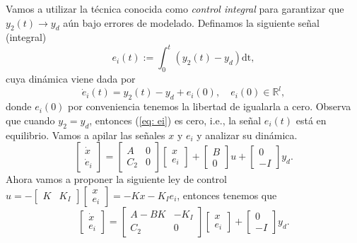 Vamos a utilizar la técnica conocida como \emph{control integral} para garantizar que $y_2(t) \to y_d$ aún bajo errores de modelado. Definamos la siguiente señal (integral)
\begin{equation}
	e_i(t) := \int_0^t (y_2(t) - y_d) \mathrm{dt},
	\label{eq: ei}
\end{equation}
cuya dinámica viene dada por
\begin{equation}
	\dot e_i(t) = y_2(t) - y_d + e_i(0), \quad e_i(0)\in\mathbb{R}^l,
	\label{eq: dei}
\end{equation}
donde $e_i(0)$ por conveniencia tenemos la libertad de igualarla a cero. Observa que cuando $y_2 = y_d$, entonces (\ref{eq: ei}) es cero, i.e., la señal $e_i(t)$ está en equilibrio. Vamos a apilar las señales $x$ y $e_i$ y analizar su dinámica.
\begin{equation}
	\begin{bmatrix}\dot x \\ \dot e_i\end{bmatrix} = \begin{bmatrix}A & 0 \\ C_2 & 0\end{bmatrix}\begin{bmatrix}x \\ e_i\end{bmatrix} + \begin{bmatrix}B \\ 0 \end{bmatrix} u + \begin{bmatrix}0 \\ -I\end{bmatrix} y_d.
	\label{eq: xei}
\end{equation}
Ahora vamos a proponer la siguiente ley de control $u = -\begin{bmatrix}K & K_I\end{bmatrix}\begin{bmatrix}x \\ e_i \end{bmatrix} = -Kx -K_Ie_i$, entonces tenemos que
	\begin{equation}
	\begin{bmatrix}\dot x \\ e_i \end{bmatrix} = \begin{bmatrix}A-BK & -K_I \\ C_2 & 0\end{bmatrix}\begin{bmatrix} x \\ e_i \end{bmatrix} + \begin{bmatrix}0 \\ -I\end{bmatrix} y_d.
	\label{eq: xeta2}
	\end{equation}

